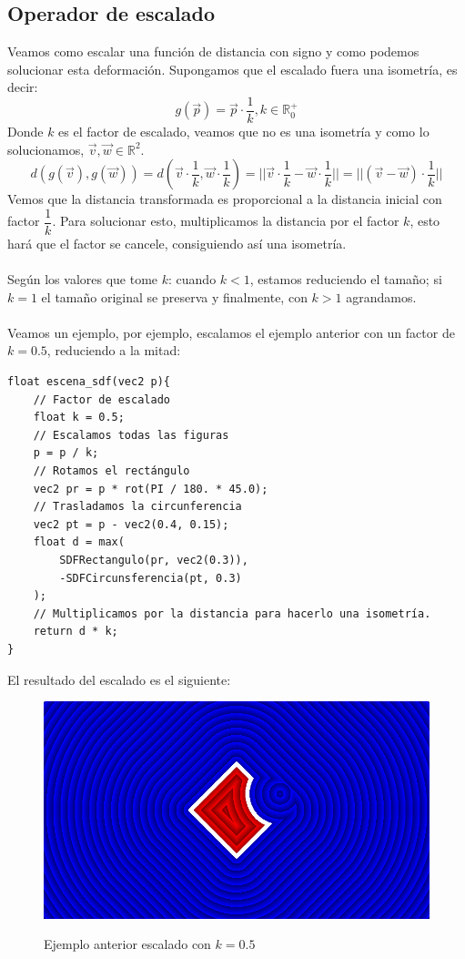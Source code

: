 \subsection{Operador de escalado}
Veamos como escalar una función de distancia con signo y como podemos solucionar esta deformación. Supongamos que el escalado fuera una isometría, es decir:
\[g(\Vec{p})=\Vec{p}\cdot \dfrac{1}{k}, k \in \mathbb{R}^{+}_{0}\]
Donde \(k\) es el factor de escalado, veamos que no es una isometría y como lo solucionamos, \(\Vec{v},\Vec{w}\in \mathbb{R}^2\).
\[d(g(\Vec{v}),g(\Vec{w}))=d\left(\Vec{v}\cdot \dfrac{1}{k}, \Vec{w}\cdot \dfrac{1}{k}\right) = \vert\vert \Vec{v}\cdot \dfrac{1}{k} - \Vec{w}\cdot \dfrac{1}{k}\vert\vert=\vert\vert (\Vec{v} - \Vec{w})\cdot \dfrac{1}{k}\vert\vert\]
Vemos que la distancia transformada es proporcional a la distancia inicial con factor \(\dfrac{1}{k}\). Para solucionar esto, multiplicamos la distancia por el factor \(k\), esto hará que el factor se cancele, consiguiendo así una isometría.\\\\
Según los valores que tome \(k\): cuando \(k<1\), estamos reduciendo el tamaño; si \(k=1\) el tamaño original se preserva y finalmente, con \(k>1\) agrandamos.\\\\
Veamos un ejemplo, por ejemplo, escalamos el ejemplo anterior con un factor de \(k=0.5\), reduciendo a la mitad:
\begin{lstlisting}
float escena_sdf(vec2 p){
    // Factor de escalado
    float k = 0.5;
    // Escalamos todas las figuras
    p = p / k;
    // Rotamos el rectángulo
    vec2 pr = p * rot(PI / 180. * 45.0);
    // Trasladamos la circunferencia
    vec2 pt = p - vec2(0.4, 0.15);
    float d = max(
        SDFRectangulo(pr, vec2(0.3)),
        -SDFCircunsferencia(pt, 0.3)
    );
    // Multiplicamos por la distancia para hacerlo una isometría.
    return d * k;
}
\end{lstlisting}

El resultado del escalado es el siguiente:

\begin{figure}[H]
  \centering
  \captionsetup{justification=centering}%
  \includegraphics[width=1.0\textwidth]{secciones/imagenes/sdf/2d/sdf_subtracted_scale.png}\label{fig:substraction}
  \caption{Ejemplo anterior escalado con \(k=0.5\)}
\end{figure}

